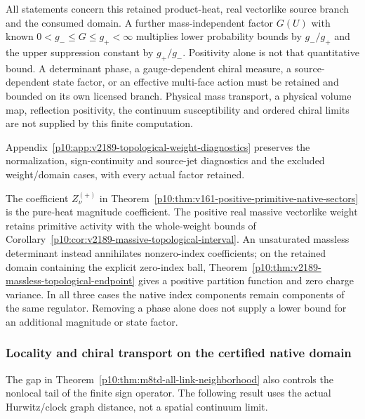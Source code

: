 \documentclass[12pt,a4paper]{article}
\begin{document}
All statements concern this retained product-heat, real vectorlike
source branch and the consumed domain. A further mass-independent factor
$G(U)$ with known $0<g_-\le G\le g_+<\infty$ multiplies lower
probability bounds by $g_-/g_+$ and the upper suppression constant by
$g_+/g_-$. Positivity alone is not that quantitative bound. A determinant
phase, a gauge-dependent chiral measure, a source-dependent state factor,
or an effective multi-face action must be retained and bounded on its
own licensed branch. Physical mass transport, a physical volume map,
reflection positivity, the continuum susceptibility and ordered chiral
limits are not supplied by this finite computation.

Appendix~\ref{p10:app:v2189-topological-weight-diagnostics} preserves the
normalization, sign-continuity and source-jet diagnostics and the
excluded weight/domain cases, with every actual factor retained.


\begin{remark}
\label{p10:rem:v2189-weight-scoped-primitive-activity}
The coefficient $Z^{(+)}_\nu$ in
Theorem~\ref{p10:thm:v161-positive-primitive-native-sectors} is the
pure-heat magnitude coefficient. The positive real massive vectorlike
weight retains primitive activity with the whole-weight bounds of
Corollary~\ref{p10:cor:v2189-massive-topological-interval}. An
unsaturated massless determinant instead annihilates nonzero-index
coefficients; on the retained domain containing the explicit zero-index
ball, Theorem~\ref{p10:thm:v2189-massless-topological-endpoint} gives
a positive partition function and zero charge variance. In all three
cases the native index components remain components of the same regulator.
Removing a phase alone does not supply a lower bound for an additional
magnitude or state factor.
\end{remark}


\subsubsection{Locality and chiral transport on the certified native domain}
\label{p10:sec:v202-overlap-locality}
The gap in Theorem~\ref{p10:thm:m8td-all-link-neighborhood} also controls
the nonlocal tail of the finite sign operator. The following result uses
the actual Hurwitz/clock graph distance, not a spatial continuum limit.
\end{document}
